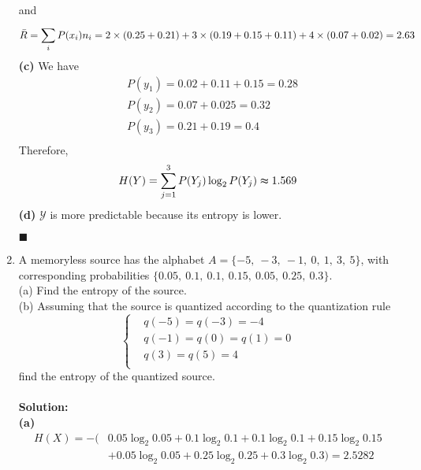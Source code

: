 \documentclass[a4paper,12pt]{article}
\begin{document}
\begin{enumerate}
            and $$\Bar{R} = \sum_{i}^{}P(x_{i})n_{i} = 2 \times (0.25 + 0.21) + 3 \times (0.19 + 0.15 + 0.11) + 4 \times (0.07 + 0.02) = 2.63$$
            \textbf{(c)} 
            We have
            $$ 
            \begin{aligned}
                & P(y_1) = 0.02 + 0.11 + 0.15 = 0.28 \\
                & P(y_2) = 0.07 + 0.025 = 0.32 \\ 
                & P(y_3) = 0.21 + 0.19 = 0.4 \\
            \end{aligned}
            $$
            Therefore, $$H(Y) = \sum_{j = 1}^{3} P(Y_j) \log_2 P(Y_j) \thickapprox 1.569$$
            \textbf{(d)}
            $\mathcal{Y}$ is more predictable because its entropy is lower.
            \begin{flushright}
                $\blacksquare$
            \end{flushright}
        \item 
            A memoryless source has the alphabet $A = \{-5, \ -3, \ -1, \ 0, \ 1, \ 3, \ 5 \}$, with corresponding probabilities $\{ 0.05, \ 0.1, \ 0.1, \ 0.15, \ 0.05, \ 0.25, \ 0.3 \}$. \\ 
            (a) Find the entropy of the source. \\ 
            (b) Assuming that the source is quantized according to the quantization rule
            $$\left\{ 
            \begin{aligned}
                & q(-5) = q(-3) = -4 \\
                & q(-1) = q(0) = q(1) = 0 \\ 
                & q(3) = q(5) = 4 \\
            \end{aligned}
            \right.
            $$ 
            find the entropy of the quantized source. \\ \\
            \textbf{Solution:} \\
            \textbf{(a)} 
            \begin{align*}
                H(X) = -( & 0.05 \log_2 0.05 + 0.1 \log_2 0.1 + 0.1 \log_2 0.1 + 0.15 \log_2 0.15 \\ & + 0.05 \log_2 0.05 + 0.25 \log_2 0.25 + 0.3 \log_2 0.3) = 2.5282
            \end{align*}

\end{enumerate}
\end{document}
